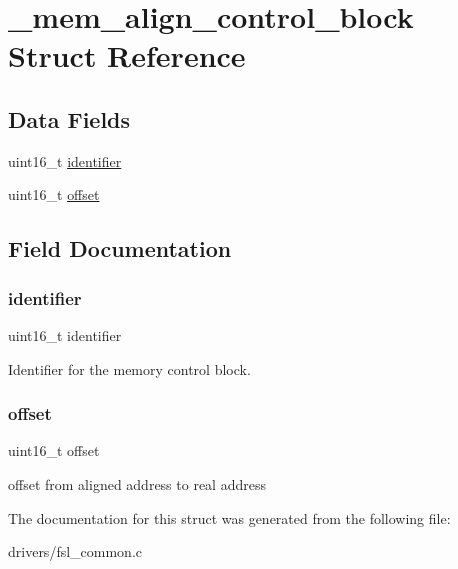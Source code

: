 \hypertarget{struct__mem__align__control__block}{}\section{\+\_\+mem\+\_\+align\+\_\+control\+\_\+block Struct Reference}
\label{struct__mem__align__control__block}
\subsection*{Data Fields}
\begin{DoxyCompactItemize}
\item 
uint16\+\_\+t \mbox{\hyperlink{struct__mem__align__control__block_a5868ad3e30cea561af39afae3efa4a7a}{identifier}}
\item 
uint16\+\_\+t \mbox{\hyperlink{struct__mem__align__control__block_ac681806181c80437cfab37335f62ff39}{offset}}
\end{DoxyCompactItemize}


\subsection{Field Documentation}
\mbox{\label{struct__mem__align__control__block_a5868ad3e30cea561af39afae3efa4a7a}} 
\subsubsection{\texorpdfstring{identifier}{identifier}}
{\footnotesize\ttfamily uint16\+\_\+t identifier}

Identifier for the memory control block. \mbox{\label{struct__mem__align__control__block_ac681806181c80437cfab37335f62ff39}} 
\subsubsection{\texorpdfstring{offset}{offset}}
{\footnotesize\ttfamily uint16\+\_\+t offset}

offset from aligned address to real address 

The documentation for this struct was generated from the following file\+:\begin{DoxyCompactItemize}
\item 
drivers/fsl\+\_\+common.\+c\end{DoxyCompactItemize}

